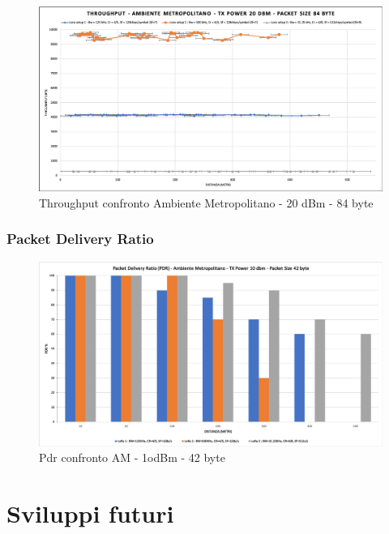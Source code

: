 \documentclass[12pt,a4paper,openright,twoside]{report}
\begin{document}
\begin{figure}[h]                      
\begin{center} 
\includegraphics[width=\textwidth]{THROUGHPUT_confronto_AM_20dBm_84byte.png}
\caption[Throughput confronto Ambiente Metropolitano - 20 dBm - 84 byte]{Throughput confronto Ambiente Metropolitano - 20 dBm - 84 byte}\label{fig:prima}
\end{center}
\end{figure}


\subsection{Packet Delivery Ratio}
\begin{figure}[h]                      
\begin{center} 
\includegraphics[width=\textwidth]{PDR_BAR_confronto_AM_10dBm-42byte.png}
\caption[Pdr confronto AM - 1odBm - 42 byte]{Pdr confronto AM - 1odBm - 42 byte}\label{fig:prima}
\end{center}
\end{figure}



\chapter{Sviluppi futuri}
\end{document}
